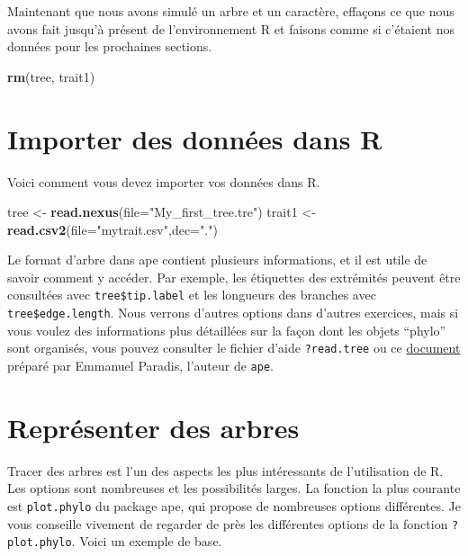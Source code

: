 \documentclass[
]{book}
\newenvironment{Shaded}{\begin{snugshade}}{\end{snugshade}}
\newcommand{\AttributeTok}[1]{\textcolor[rgb]{0.13,0.29,0.53}{#1}}
\newcommand{\FunctionTok}[1]{\textcolor[rgb]{0.13,0.29,0.53}{\textbf{#1}}}
\newcommand{\NormalTok}[1]{#1}
\newcommand{\OtherTok}[1]{\textcolor[rgb]{0.56,0.35,0.01}{#1}}
\newcommand{\StringTok}[1]{\textcolor[rgb]{0.31,0.60,0.02}{#1}}
\begin{document}
Maintenant que nous avons simulé un arbre et un caractère, effaçons ce que nous avons fait jusqu'à présent de l'environnement R et faisons comme si c'étaient nos données pour les prochaines sections.

\begin{Shaded}
\begin{Highlighting}[]
\FunctionTok{rm}\NormalTok{(tree, trait1)}
\end{Highlighting}
\end{Shaded}

\section{Importer des données dans R}\label{importer-des-donnuxe9es-dans-r}

Voici comment vous devez importer vos données dans R.

\begin{Shaded}
\begin{Highlighting}[]
\NormalTok{tree }\OtherTok{\textless{}{-}} \FunctionTok{read.nexus}\NormalTok{(}\AttributeTok{file=}\StringTok{"My\_first\_tree.tre"}\NormalTok{)}
\NormalTok{trait1 }\OtherTok{\textless{}{-}} \FunctionTok{read.csv2}\NormalTok{(}\AttributeTok{file=}\StringTok{"mytrait.csv"}\NormalTok{,}\AttributeTok{dec=}\StringTok{"."}\NormalTok{)}
\end{Highlighting}
\end{Shaded}

Le format d'arbre dans ape contient plusieurs informations, et il est utile de savoir comment y accéder. Par exemple, les étiquettes des extrémités peuvent être consultées avec \texttt{tree\$tip.label} et les longueurs des branches avec \texttt{tree\$edge.length}. Nous verrons d'autres options dans d'autres exercices, mais si vous voulez des informations plus détaillées sur la façon dont les objets ``phylo'' sont organisés, vous pouvez consulter le fichier d'aide \texttt{?read.tree} ou ce \href{http://ape-package.ird.fr/misc/FormatTreeR_24Oct2012.pdf}{document} préparé par Emmanuel Paradis, l'auteur de \texttt{ape}.

\section{Représenter des arbres}\label{repruxe9senter-des-arbres}

Tracer des arbres est l'un des aspects les plus intéressants de l'utilisation de R. Les options sont nombreuses et les possibilités larges. La fonction la plus courante est \texttt{plot.phylo} du package ape, qui propose de nombreuses options différentes. Je vous conseille vivement de regarder de près les différentes options de la fonction \texttt{?plot.phylo}. Voici un exemple de base.
\end{document}
